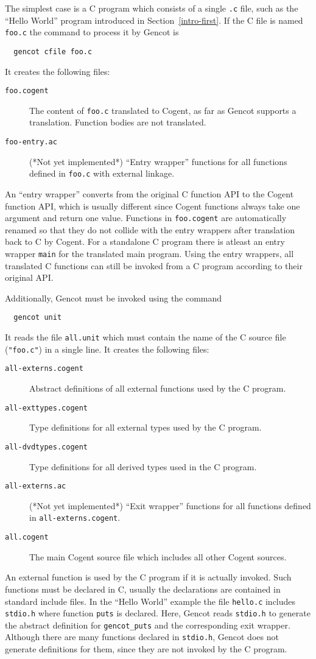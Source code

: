 \documentclass[a4paper]{report}
\newcommand{\code}[1]{\textnormal{\texttt{#1}}}
\begin{document}
The simplest case is a C program which consists of a single \code{.c} file, such as the ``Hello World'' program
introduced in Section~\ref{intro-first}. If the C file is named \code{foo.c} the command to process it by Gencot is
\begin{verbatim}
  gencot cfile foo.c
\end{verbatim}
It creates the following files:
\begin{description}
\item[\code{foo.cogent}] The content of \code{foo.c} translated to Cogent, as far as Gencot supports a translation.
Function bodies are not translated.
\item[\code{foo-entry.ac}] (*Not yet implemented*) ``Entry wrapper'' functions for all functions defined in \code{foo.c} 
with external linkage.
\end{description}

An ``entry wrapper'' converts from the original C function API to the Cogent function API, which is usually different 
since Cogent functions always take one argument and return one value. Functions in \code{foo.cogent} are automatically
renamed so that they do not collide with the entry wrappers after translation back to C by Cogent. For a standalone
C program there is atleast an entry wrapper \code{main} for the translated main program. Using the entry wrappers, all
translated C functions can still be invoked from a C program according to their original API.

Additionally, Gencot must be invoked using the command
\begin{verbatim}
  gencot unit
\end{verbatim}
It reads the file \code{all.unit} which must contain the name of the C source file (\code{"foo.c"}) in a single line. 
It creates the following files:
\begin{description}
\item[\code{all-externs.cogent}] Abstract definitions of all external functions used by the C program.
\item[\code{all-exttypes.cogent}] Type definitions for all external types used by the C program.
\item[\code{all-dvdtypes.cogent}] Type definitions for all derived types used in the C program.
\item[\code{all-externs.ac}] (*Not yet implemented*) ``Exit wrapper'' functions for all functions defined in 
\code{all-externs.cogent}.
\item[\code{all.cogent}] The main Cogent source file which includes all other Cogent sources.
\end{description}
An external function is used by the C program if it is actually invoked. Such functions must be declared in C, usually
the declarations are contained in standard include files. In the ``Hello World'' example the file \code{hello.c} includes
\code{stdio.h} where function \code{puts} is declared. Here, Gencot reads \code{stdio.h} to generate the abstract definition for
\code{gencot\_puts} and the corresponding exit wrapper. Although there are many functions declared in \code{stdio.h}, Gencot
does not generate definitions for them, since they are not invoked by the C program.
\end{document}
